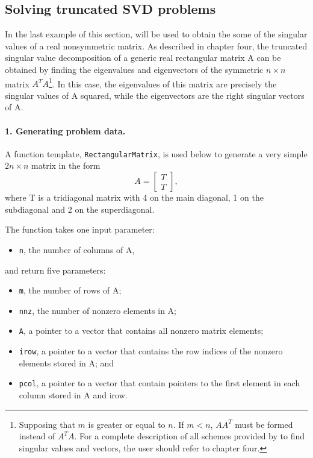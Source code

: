 \subsection{Solving truncated SVD problems}

In the last example of this section, \ARPP{} will be used to obtain the some of the singular values of a real nonsymmetric matrix. As described in chapter four, the truncated singular value decomposition of a generic real rectangular matrix A can be obtained by finding the eigenvalues and eigenvectors of the symmetric $n\times n$ matrix $A^{T}A$\footnote{Supposing that $m$ is greater or equal to $n$. If $m < n$, $AA^T$ must be formed instead of $A^{T}A$. For a complete description of all schemes provided by \ARPP{} to find singular values and vectors, the user should refer to chapter four.}. In this case, the eigenvalues of this matrix are precisely the singular values of A squared, while the eigenvectors are the right singular vectors of A.

\paragraph{1. Generating problem data.}

A function template, \texttt{RectangularMatrix}, is used below to generate a very simple $2n\times n$ matrix in the form 
\[A=\left[\begin{array}{c} {T} \\ {T} \end{array}\right], \] 
where T is a tridiagonal matrix with 4 on the main diagonal, 1 on the subdiagonal and 2 on the superdiagonal. 

The function takes one input parameter:

\begin{itemize}
	\item \texttt{n}, the number of columns of A,
\end{itemize}
and return five parameters:
\begin{itemize}
	\item \texttt{m}, the number of rows of A;
	\item \texttt{nnz}, the number of nonzero elements in A;
	\item \texttt{A}, a pointer to a vector that contains all nonzero matrix elements;
	\item \texttt{irow}, a pointer to a vector that contains the row indices of the nonzero elements stored in A; and
	\item \texttt{pcol}, a pointer to a vector that contain pointers to the first element in each column stored in A and irow.
\end{itemize}

